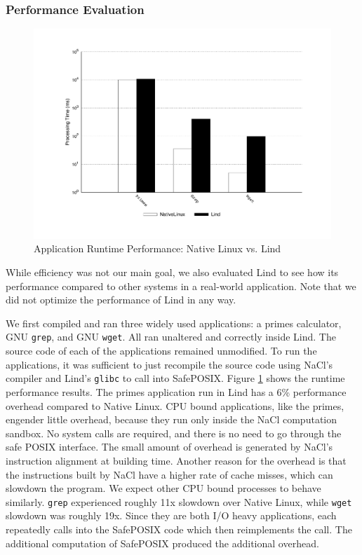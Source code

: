 \subsubsection{Performance Evaluation}
\label{Performance-Evaluation}

\begin{figure}
\centering
\includegraphics[width=1.0\columnwidth]{diagram/lind_oakland16_performance.pdf}
\caption{Application Runtime Performance: Native Linux vs. Lind}
\label{fig:performance_applications}
\end{figure}

While efficiency was not our main goal, we also evaluated Lind to see
how its performance compared to other systems in a real-world application.
Note that we did not optimize the performance of Lind in any way.

We first compiled and ran three widely used applications:
a primes calculator, GNU \texttt{grep}, and GNU \texttt{wget}. All ran unaltered and
correctly inside Lind. The source code of each of the applications remained
unmodified. To run the applications, it was sufficient to just recompile the
source code using NaCl's compiler and Lind's \texttt{glibc} to call
into SafePOSIX.
Figure \ref{fig:performance_applications} shows the runtime performance
results.
The primes application run in Lind has a 6\% performance overhead compared to
Native Linux. CPU bound applications, like the primes, engender little overhead,
because they run only inside the NaCl computation sandbox. No system calls are required,
and there is no need to go through the safe POSIX interface. The small amount of overhead
is generated by NaCl's instruction alignment at building time. Another reason for the overhead
is that the instructions built by NaCl have a higher rate of cache misses, which can slowdown the
program.
We expect other CPU bound processes to behave similarly.
\texttt{grep} experienced roughly 11x slowdown over Native Linux, while \texttt{wget}
slowdown was roughly 19x. Since they are both I/O heavy applications,
each repeatedly calls into the SafePOSIX code which then reimplements
the call.  The additional computation of SafePOSIX produced the additional
overhead.

